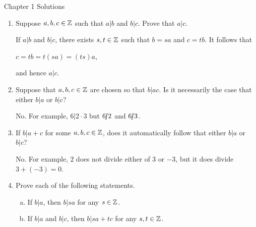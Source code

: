 \documentclass[11pt,fleqn,dvipsnames,usenames]{article}
\renewcommand{\headrulewidth}{1pt}
\begin{document}
\fancyhead[L]{\course}
\fancyhead[R]{\term}
\renewcommand{\headrulewidth}{0.4pt}

{\huge Chapter 1 Solutions}
\vsp

\begin{enumerate}
\item Suppose $a,b,c\in\mathbb{Z}$ such that $a|b$ and $b|c$.  Prove that $a|c$.
\vsp

\solution If $a|b$ and $b|c$, there exists $s,t\in\mathbb{Z}$ such that $b = sa$ and $c = tb$.  It follows that
\begin{center}
$c = tb = t(sa) = (ts)a$,
\end{center}
and hence $a|c$.

\item Suppose that $a,b,c\in\mathbb{Z}$ are chosen so that $b|ac$.  Is it necessarily the case that either $b|a$ or $b|c$?
\vsp

\solution No.  For example, $6|2\cdot 3$ but $6|\kern-0.9ex{/} 2$ and $6|\kern-0.9ex{/} 3$.

\item If $b|a+c$ for some $a,b,c\in \mathbb{Z}$, does it automatically follow that either $b|a$ or $b|c$?
\vsp

\solution No.  For example, $2$ does not divide either of $3$ or $-3$, but it does divide $3 + (-3) = 0$.
\vsp

\item Prove each of the following statements.
\begin{enumerate}[(a)]
\item If $b|a$, then $b|sa$ for any $s\in\mathbb{Z}$.
\item If $b|a$ and $b|c$, then $b|sa+tc$ for any $s,t\in\mathbb{Z}$.
\end{enumerate}
\vsp



\end{enumerate}
\end{document}
